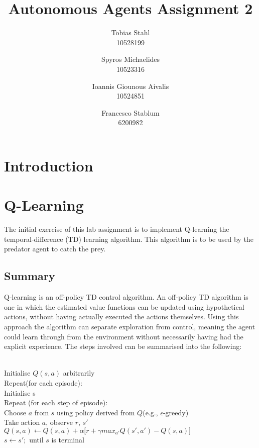 \documentclass[11pt]{article}
\title{
	\textbf{Autonomous Agents Assignment 2}
}
\author{Tobias Stahl \\ 10528199 \and Spyros Michaelides \\ 10523316 \and Ioannis Giounous Aivalis \\ 10524851 \and Francesco Stablum \\ 6200982}
\begin{document}
\maketitle




\section{Introduction}



\section{Q-Learning}
The initial exercise of this lab assignment is to implement Q-learning the temporal-difference (TD) learning algorithm. This algorithm is to be used by the predator agent to catch the prey.



\subsection{Summary}
Q-learning is an off-policy TD control algorithm. An off-policy TD algorithm is one in which the estimated value functions can be updated using hypothetical actions, without having actually executed the actions themselves. Using this approach the algorithm can separate exploration from control, meaning the agent could learn through from the environment without necessarily having had the explicit experience.
The steps involved can be summarised into the following:\\\\

\pagebreak

\noindent Initialise $Q(s,a)$ arbitrarily\\
Repeat(for each episode):\\
\hspace*{10mm} Initialise s\\
\hspace*{10mm} Repeat (for each step of episode):\\
\hspace*{20mm} Choose $a$ from $s$ using policy derived from $Q$(e.g., $\epsilon$-greedy)\\
\hspace*{20mm} Take action $a$, observe $r$, $s'$\\
\hspace*{20mm} $Q(s,a) \leftarrow Q(s,a) + \alpha \lbrack r + \gamma max_{a'} Q(s',a') - Q(s,a)\rbrack$\\
$s \leftarrow s';$
until $s$ is terminal\\
\end{document}
